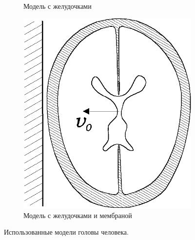 \begin{figure}[h]
\begin{subfigure}[b]{0.3\textwidth}
\caption{Модель с желудочками}
\end{subfigure}
\begin{subfigure}[b]{0.3\textwidth}
\centering
\includegraphics[width=\textwidth]{png/cranium/2d-problem-3.png}
\caption{Модель с желудочками и мембраной}
\end{subfigure}
\caption{Использованные модели головы человека.}
\label{pic:cranium_2d_problem}
\end{figure}



